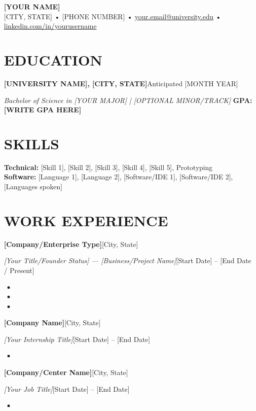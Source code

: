 \documentclass[10pt,letterpaper]{article}
\newenvironment{resumeentry}[2]{%
\vspace{1pt}\textbf{#1}\hfill {\small #2}\par
}{\vspace{0pt}}
\newenvironment{resumeentrywide}[4]{%
\vspace{1pt}\textbf{#1}\hfill {\small #2}\par
\textit{#3}\hfill {\small #4}\par
}{\vspace{0pt}}
\begin{document}
\pagestyle{empty}
\begin{center}
{\Large \textbf{[YOUR NAME]}}\\[-1pt]
[CITY, STATE] • [PHONE NUMBER] • 
\href{mailto:your.email@university.edu}{your.email@university.edu} • 
\href{https://www.linkedin.com/in/yourusername}{linkedin.com/in/yourusername}
\end{center}
\vspace{-6pt}
\section*{EDUCATION}
\begin{resumeentry}{[UNIVERSITY NAME], [CITY, STATE]}{Anticipated [MONTH YEAR]}\end{resumeentry}
\textit{Bachelor of Science in [YOUR MAJOR] | [OPTIONAL MINOR/TRACK]} \hfill \textbf{GPA: [WRITE GPA HERE]}
\section*{SKILLS}
\textbf{Technical:} [Skill 1], [Skill 2], [Skill 3], [Skill 4], [Skill 5], Prototyping \\
\textbf{Software:} [Language 1], [Language 2], [Software/IDE 1], [Software/IDE 2], [Languages spoken]
\section*{WORK EXPERIENCE}
\begin{resumeentrywide}
{[Company/Enterprise Type]}{[City, State]}
{[Your Title/Founder Status] — [Business/Project Name]}{[Start Date] – [End Date / Present]}
\end{resumeentrywide}
\begin{itemize}
\item 
\item 
\item 
\end{itemize}
\vspace{6pt}
\begin{resumeentrywide}
{[Company Name]}{[City, State]}
{[Your Internship Title]}{[Start Date] – [End Date]}
\end{resumeentrywide}
\begin{itemize}
\item 
\end{itemize}
\vspace{6pt}
\begin{resumeentrywide}
{[Company/Center Name]}{[City, State]}
{[Your Job Title]}{[Start Date] – [End Date]}
\end{resumeentrywide}
\begin{itemize}
\item 
\end{itemize}
\vspace{6pt}
\end{document}

